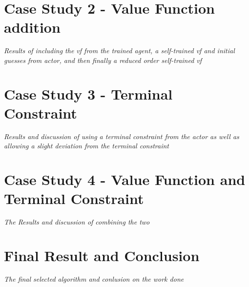 \section{Case Study 2 - Value Function addition}
\emph{Results of including the vf from the trained agent, a self-trained vf and initial guesses from actor, and then finally a reduced order self-trained vf}

\section{Case Study 3 - Terminal Constraint}
\emph{Results and discussion of using a terminal constraint from the actor as well as allowing a slight deviation from the terminal constraint}

\section{Case Study 4 - Value Function and Terminal Constraint}
\emph{The Results and discussion of combining the two}

\section{Final Result and Conclusion}
\emph{The final selected algorithm and conlusion on the work done}

